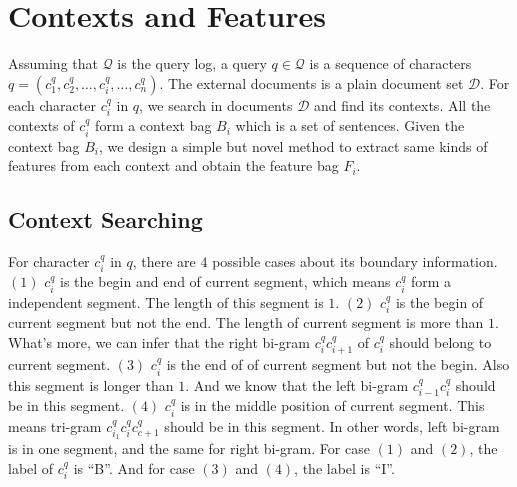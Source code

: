 \section{Contexts and Features}
\label{sec:framework}

Assuming that $\mathcal{Q}$ is the query log, a query $q \in \mathcal{Q}$ is a sequence of characters $q = (c_1^q, c_2^q, \ldots, c_i^q, \ldots, c_n^q)$. The external documents is a plain document set $\mathcal{D}$. For each character $c_i^q$ in $q$, we search in documents $\mathcal{D}$ and find its contexts. All the contexts of $c_i^q$ form a context bag $B_i$ which is a set of sentences. Given the context bag $B_i$, we design a simple but novel method to extract same kinds of features from each context and obtain the feature bag $F_i$.


\subsection{Context Searching}

For character $c_i^q$ in $q$, there are $4$ possible cases about its boundary information. $(1)$ $c_i^q$ is the begin and end of current segment, which means $c_i^q$ form a independent segment. The length of this segment is $1$. $(2)$ $c_i^q$ is the begin of current segment but not the end. The length of current segment is more than $1$. What's more, we can infer that the right bi-gram $c_i^qc_{i+1}^q$ of $c_i^q$ should belong to current segment. $(3)$ $c_i^q$ is the end of of current segment but not the begin. Also this segment is longer than $1$. And we know that the left bi-gram $c_{i-1}^q c_i^q$ should be in this segment. $(4)$ $c_i^q$ is in the middle position of current segment. This means tri-gram $c_{i_1}^q c_i^q c_{c+1}^q$ should be in this segment. In other words, left bi-gram is in one segment, and the same for right bi-gram. For case $(1)$ and $(2)$, the label of $c_i^q$ is ``B''. And for case $(3)$ and $(4)$, the label is ``I''.


